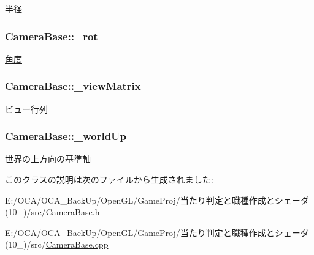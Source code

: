 半径 

\hypertarget{class_camera_base_a26a9abf2c69bd35302dfd5546facaa59}{
\subsubsection[{\-\_\-rot}]{ Camera\-Base\-::\-\_\-rot\hspace{0.3cm}{\ttfamily [protected]}}}\label{class_camera_base_a26a9abf2c69bd35302dfd5546facaa59}


\hyperlink{class_xE8_xA7_x92_xE5_xBA_xA6}{角度} 

\hypertarget{class_camera_base_ac982bf8a4c710d101c988618346d144d}{
\subsubsection[{\-\_\-view\-Matrix}]{ Camera\-Base\-::\-\_\-view\-Matrix\hspace{0.3cm}{\ttfamily [protected]}}}\label{class_camera_base_ac982bf8a4c710d101c988618346d144d}


ビュー行列 

\hypertarget{class_camera_base_ad65432efc07bb5d95268166cb432e0b2}{
\subsubsection[{\-\_\-world\-Up}]{ Camera\-Base\-::\-\_\-world\-Up\hspace{0.3cm}{\ttfamily [protected]}}}\label{class_camera_base_ad65432efc07bb5d95268166cb432e0b2}


世界の上方向の基準軸 



このクラスの説明は次のファイルから生成されました\-:\begin{DoxyCompactItemize}
\item 
E\-:/\-O\-C\-A/\-O\-C\-A\-\_\-\-Back\-Up/\-Open\-G\-L/\-Game\-Proj/当たり判定と職種作成とシェーダ(10\-\_)/src/\hyperlink{_camera_base_8h}{Camera\-Base.\-h}\item 
E\-:/\-O\-C\-A/\-O\-C\-A\-\_\-\-Back\-Up/\-Open\-G\-L/\-Game\-Proj/当たり判定と職種作成とシェーダ(10\-\_)/src/\hyperlink{_camera_base_8cpp}{Camera\-Base.\-cpp}\end{DoxyCompactItemize}
